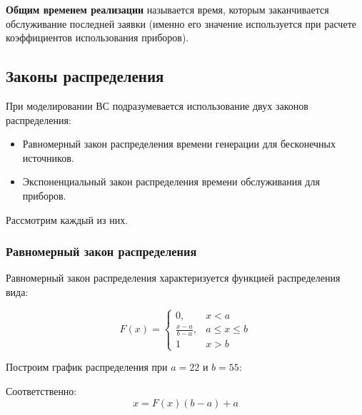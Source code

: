 \documentclass[a4paper, 14pt]{article}
\begin{document}
\textbf{Общим временем реализации} называется время, которым заканчивается обслуживание последней заявки (именно его значение используется при расчете коэффициентов использования приборов).

\subsection{Законы распределения}

При моделировании ВС подразумевается использование двух законов распределения:
\begin{itemize}
	\item Равномерный закон распределения времени генерации для бесконечных источников.
	\item Экспоненциальный закон распределения времени обслуживания для приборов.
\end{itemize}
Рассмотрим каждый из них.

\subsubsection{Равномерный закон распределения}

Равномерный закон распределения характеризуется функцией распределения вида:

\begin{equation*}
	F(x) =
	\begin{cases}
		0,               & x < a         \\
		\frac{x-a}{b-a}, & a \le x \le b \\
		1                & x > b
	\end{cases}
\end{equation*}

Построим график распределения при $a = 22$ и $b = 55$:


Соответственно:
\begin{equation}
	x=F(x)(b-a)+a
\end{equation}
\end{document}

